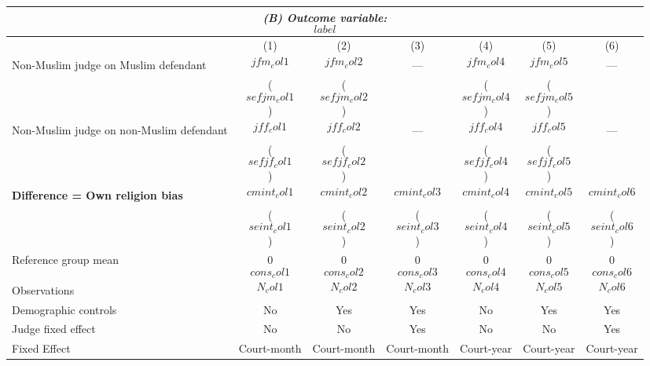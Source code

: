 {
\def\sym#1{\ifmmode^{#1}\else\(^{#1}\)\fi}
\begin{tabular}{l*{6}{c}}
  \hline\hline
\multicolumn{7}{c}{\textit{(B) Outcome variable: $$label$$}}\\
\hline
&\multicolumn{1}{c}{(1)}&\multicolumn{1}{c}{(2)}&\multicolumn{1}{c}{(3)}&\multicolumn{1}{c}{(4)}&\multicolumn{1}{c}{(5)}&\multicolumn{1}{c}{(6)}\\
\hline
Non-Muslim judge on Muslim defendant \hspace{15mm}& $$jfm_col1$$ & $$jfm_col2$$ & --- & $$jfm_col4$$ & $$jfm_col5$$ & --- \\
& ($$sefjm_col1$$) & ($$sefjm_col2$$) &  & ($$sefjm_col4$$) &($$sefjm_col5$$) &  \\
Non-Muslim judge on non-Muslim defendant \hspace{15mm}& $$jff_col1$$ & $$jff_col2$$ & ---& $$jff_col4$$ & $$jff_col5$$ & --- \\
& ($$sefjf_col1$$) & ($$sefjf_col2$$) &  & ($$sefjf_col4$$) & ($$sefjf_col5$$) &  \\
\textbf{Difference = Own religion bias} & $$cmint_col1$$ & $$cmint_col2$$ & $$cmint_col3$$ & $$cmint_col4$$ & $$cmint_col5$$ & $$cmint_col6$$ \\
& ($$seint_col1$$) & ($$seint_col2$$) & ($$seint_col3$$) & ($$seint_col4$$) & ($$seint_col5$$) & ($$seint_col6$$) \\
\hline
Reference group mean & 0$$cons_col1$$ & 0$$cons_col2$$ & 0$$cons_col3$$ & 0$$cons_col4$$ & 0$$cons_col5$$ & 0$$cons_col6$$ \\
Observations & $$N_col1$$ & $$N_col2$$ & $$N_col3$$ & $$N_col4$$ & $$N_col5$$ & $$N_col6$$ \\
Demographic controls & No & Yes & Yes & No & Yes & Yes \\
Judge fixed effect & No & No & Yes & No & No & Yes \\
Fixed Effect & Court-month & Court-month & Court-month & Court-year & Court-year & Court-year \\
\hline\hline
\end{tabular}
}
 
